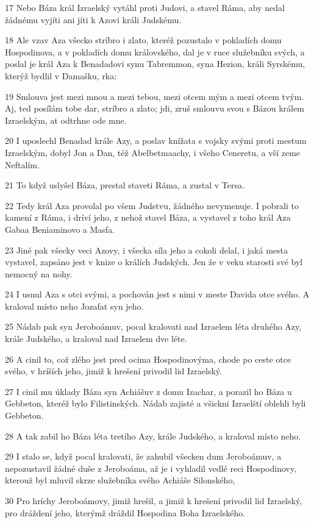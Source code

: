 \par 17 Nebo Báza král Izraelský vytáhl proti Judovi, a stavel Ráma, aby nedal žádnému vyjíti ani jíti k Azovi králi Judskému.
\par 18 Ale vzav Aza všecko stríbro i zlato, kteréž pozustalo v pokladích domu Hospodinova, a v pokladích domu královského, dal je v ruce služebníku svých, a poslal je král Aza k Benadadovi synu Tabremmon, syna Hezion, králi Syrskému, kterýž bydlil v Damašku, rka:
\par 19 Smlouva jest mezi mnou a mezi tebou, mezi otcem mým a mezi otcem tvým. Aj, ted posílám tobe dar, stríbro a zlato; jdi, zruš smlouvu svou s Bázou králem Izraelským, at odtrhne ode mne.
\par 20 I uposlechl Benadad krále Azy, a poslav knížata s vojsky svými proti mestum Izraelským, dobyl Jon a Dan, též Abelbetmaachy, i všeho Ceneretu, a vší zeme Neftalím.
\par 21 To když uslyšel Báza, prestal staveti Ráma, a zustal v Tersa.
\par 22 Tedy král Aza provolal po všem Judstvu, žádného nevymenuje. I pobrali to kamení z Ráma, i dríví jeho, z nehož stavel Báza, a vystavel z toho král Aza Gabaa Beniaminovo a Masfa.
\par 23 Jiné pak všecky veci Azovy, i všecka síla jeho a cokoli delal, i jaká mesta vystavel, zapsáno jest v knize o králích Judských. Jen že v veku starosti své byl nemocný na nohy.
\par 24 I usnul Aza s otci svými, a pochován jest s nimi v meste Davida otce svého. A kraloval místo neho Jozafat syn jeho.
\par 25 Nádab pak syn Jeroboámuv, pocal kralovati nad Izraelem léta druhého Azy, krále Judského, a kraloval nad Izraelem dve léte.
\par 26 A cinil to, což zlého jest pred ocima Hospodinovýma, chode po ceste otce svého, v hríších jeho, jimiž k hrešení privodil lid Izraelský.
\par 27 I cinil mu úklady Báza syn Achiášuv z domu Izachar, a porazil ho Báza u Gebbeton, kteréž bylo Filistinských. Nádab zajisté a všickni Izraelští oblehli byli Gebbeton.
\par 28 A tak zabil ho Báza léta tretího Azy, krále Judského, a kraloval místo neho.
\par 29 I stalo se, když pocal kralovati, že zahubil všecken dum Jeroboámuv, a nepozustavil žádné duše z Jeroboáma, až je i vyhladil vedlé reci Hospodinovy, kterouž byl mluvil skrze služebníka svého Achiáše Silonského,
\par 30 Pro hríchy Jeroboámovy, jimiž hrešil, a jimiž k hrešení privodil lid Izraelský, pro dráždení jeho, kterýmž dráždil Hospodina Boha Izraelského.
